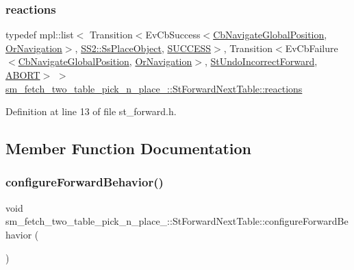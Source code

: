\subsubsection{\texorpdfstring{reactions}{reactions}}
{\footnotesize\ttfamily typedef mpl\+::list$<$ Transition$<$Ev\+Cb\+Success$<$\hyperlink{classcl__move__base__z_1_1CbNavigateGlobalPosition}{Cb\+Navigate\+Global\+Position}, \hyperlink{classsm__fetch__two__table__pick__n__place__1_1_1OrNavigation}{Or\+Navigation}$>$, \hyperlink{structsm__fetch__two__table__pick__n__place__1_1_1SS2_1_1SsPlaceObject}{S\+S2\+::\+Ss\+Place\+Object}, \hyperlink{classSUCCESS}{S\+U\+C\+C\+E\+SS}$>$, Transition$<$Ev\+Cb\+Failure$<$\hyperlink{classcl__move__base__z_1_1CbNavigateGlobalPosition}{Cb\+Navigate\+Global\+Position}, \hyperlink{classsm__fetch__two__table__pick__n__place__1_1_1OrNavigation}{Or\+Navigation}$>$, \hyperlink{structsm__fetch__two__table__pick__n__place__1_1_1StUndoIncorrectForward}{St\+Undo\+Incorrect\+Forward}, \hyperlink{classABORT}{A\+B\+O\+RT}$>$ $>$ \hyperlink{structsm__fetch__two__table__pick__n__place__1_1_1StForwardNextTable_a39ccca708ce11206c24873c140667b75}{sm\+\_\+fetch\+\_\+two\+\_\+table\+\_\+pick\+\_\+n\+\_\+place\+\_\+::\+St\+Forward\+Next\+Table\+::reactions}}



Definition at line 13 of file st\+\_\+forward.\+h.



\subsection{Member Function Documentation}
\mbox{\label{structsm__fetch__two__table__pick__n__place__1_1_1StForwardNextTable_ae2358c473474c13a9cf8c017ec7e7735}} 
\subsubsection{\texorpdfstring{configure\+Forward\+Behavior()}{configureForwardBehavior()}}
{\footnotesize\ttfamily void sm\+\_\+fetch\+\_\+two\+\_\+table\+\_\+pick\+\_\+n\+\_\+place\+\_\+::\+St\+Forward\+Next\+Table\+::configure\+Forward\+Behavior (\begin{DoxyParamCaption}{ }\end{DoxyParamCaption})\hspace{0.3cm}{\ttfamily [inline]}}



